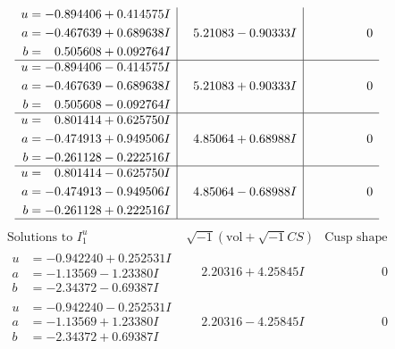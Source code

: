 \documentclass[1p]{elsarticle_modified}
\theoremstyle{definition}
\newcommand{\I}{\sqrt{-1}}
\begin{document}
$$\begin{array}{c|c|c}
\begin{aligned}
u &= -0.894406 + 0.414575 I \\
a &= -0.467639 + 0.689638 I \\
b &= \phantom{-}0.505608 + 0.092764 I\end{aligned}
 & \phantom{-}5.21083 - 0.90333 I & \phantom{-0.000000 } 0 \\ \hline\begin{aligned}
u &= -0.894406 - 0.414575 I \\
a &= -0.467639 - 0.689638 I \\
b &= \phantom{-}0.505608 - 0.092764 I\end{aligned}
 & \phantom{-}5.21083 + 0.90333 I & \phantom{-0.000000 } 0 \\ \hline\begin{aligned}
u &= \phantom{-}0.801414 + 0.625750 I \\
a &= -0.474913 + 0.949506 I \\
b &= -0.261128 - 0.222516 I\end{aligned}
 & \phantom{-}4.85064 + 0.68988 I & \phantom{-0.000000 } 0 \\ \hline\begin{aligned}
u &= \phantom{-}0.801414 - 0.625750 I \\
a &= -0.474913 - 0.949506 I \\
b &= -0.261128 + 0.222516 I\end{aligned}
 & \phantom{-}4.85064 - 0.68988 I & \phantom{-0.000000 } 0\\
 \hline 
 \end{array}$$\newpage$$\begin{array}{c|c|c}  
\text{Solutions to }I^u_{1}& \I (\text{vol} + \sqrt{-1}CS) & \text{Cusp shape}\\
 \hline 
\begin{aligned}
u &= -0.942240 + 0.252531 I \\
a &= -1.13569 - 1.23380 I \\
b &= -2.34372 - 0.69387 I\end{aligned}
 & \phantom{-}2.20316 + 4.25845 I & \phantom{-0.000000 } 0 \\ \hline\begin{aligned}
u &= -0.942240 - 0.252531 I \\
a &= -1.13569 + 1.23380 I \\
b &= -2.34372 + 0.69387 I\end{aligned}
 & \phantom{-}2.20316 - 4.25845 I & \phantom{-0.000000 } 0 \\ \hline\begin{aligned}

\end{aligned}
\end{array}$$
\end{document}
